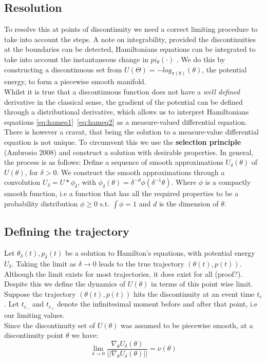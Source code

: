 \documentclass[]{report}
\newcommand{\tif}{\textit}
\begin{document}
\subsection{Resolution}
To resolve this at points of discontinuity we need a correct limiting procedure to take into account the steps. A note on integrability, provided the discontinuities at the boundaries can be detected, Hamiltonians equations can be integrated to take into account the instantaneous change in $pi_{\theta}(\cdot)$ . We do this by constructing a discontinuous set from $U(\Theta) = -log_{\pi(\theta)}(\theta)$, the potential energy, to form a piecewise smooth manifold.\\

Whilst it is true that a discontinuous function does not have a \tif{well defined} derivative in the classical sense, the gradient of the potential can be defined through a distributional derivative, which allows us to interpret Hamiltonians equations \ref{eq:hameq1}\ \ref{eq:hameq2} as a measure-valued differential equation. There is however a cravat, that being the solution to a measure-value differential equation is not unique. To circumvent this we use the \textbf{selection principle} (Ambrosio 2008) and construct a solution with desirable properties.
In general, the process is as follows: Define a sequence of smooth approximations $U_{\delta}(\theta)$ of $U(\theta)$, for $\delta > 0$. We construct the smooth approximations through a convolution $U_{\delta} = U \ast \phi_{\delta}$, with $\phi_{\delta}(\theta) = \delta^{-d}\phi(\delta^{-1}\theta)$. Where $\phi$ is a compactly smooth function, i.e a function that has all the required properties to be a probability distribution $\phi \ge 0$ s.t. $\int \phi = 1$ and $d$ is the dimension of $\theta$.

\subsection{Defining the trajectory}
Let $\theta_{\delta}(t), p_{\delta}(t)$ be a solution to Hamilton's equations, with potential energy $U_{\delta}$. Taking the limit as $\delta \rightarrow 0$ leads to the true trajectory $(\theta(t), p(t))$. Although the limit exists for most trajectories, it does exist for all (proof?). Despite this we define the dynamics of $U(\theta)$ in terms of this point wise limit. 
Suppose the trajectory $(\theta(t), p(t))$ hits the discontinuity at an event time $t_{e}$. Let $t_{e_{-}}$ and $t_{e_{+}}$ denote the infinitesimal moment before and after that point, i.e our limiting values.\\
Since the discontinuity set of $U(\theta)$ was assumed to be piecewise smooth, at a discontinuity point $\theta$ we have:
\begin{equation}
\label{eq:discpoint}
 \lim_{\delta \to 0} \frac{\nabla_{\theta} U_{\delta}(\theta)}{||\nabla_{\theta}U_{\delta}(\theta)||}=\nu(\theta) 
\end{equation}   
\end{document}
